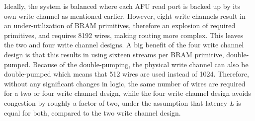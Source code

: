 Ideally, the system is balanced where each AFU read port is backed up by its own write channel as mentioned earlier. However, eight write channels result in an under-utilization of BRAM primitives, therefore an explosion of required primitives, and requires 8192 wires, making routing more complex. This leaves the two and four write channel designs. A big benefit of the four write channel design is that this results in using sixteen streams per BRAM primitive, double-pumped. Because of the double-pumping, the physical write channel can also be double-pumped which means that 512 wires are used instead of 1024. Therefore, without any significant changes in logic, the same number of wires are required for a two or four write channel design, while the four write channel design avoids congestion by roughly a factor of two, under the assumption that latency \textit{L} is equal for both, compared to the two write channel design.



